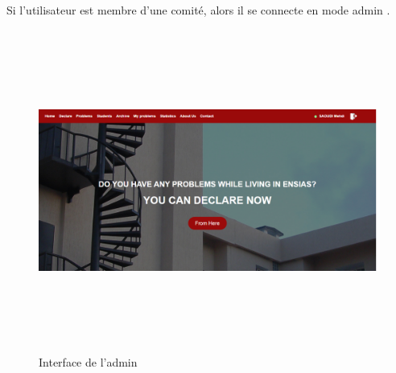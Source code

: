 \documentclass[11.5pt]{report}
\begin{document}
\newpage
Si l'utilisateur est membre d'une comité, alors il se connecte en mode admin .\\
\begin{figure}[h]
	
	\begin{center}
		\includegraphics[width=500pt,height=300pt]{home-admin.png} 
		\caption{Interface de l'admin}
	\end{center}
	
\end{figure}
\newpage
\end{document}
